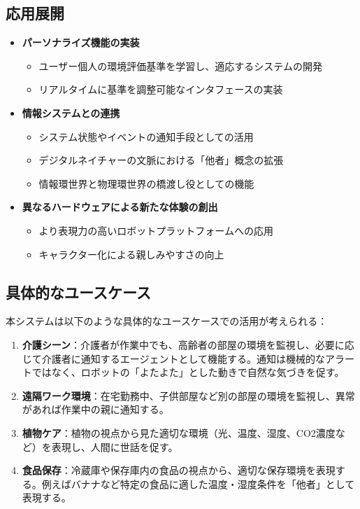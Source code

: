 \documentclass{cuxarticle}
\begin{document}
\subsection{応用展開}
\begin{itemize}
  \item \textbf{パーソナライズ機能の実装}
    \begin{itemize}
      \item ユーザー個人の環境評価基準を学習し、適応するシステムの開発
      \item リアルタイムに基準を調整可能なインタフェースの実装
    \end{itemize}

  \item \textbf{情報システムとの連携}
    \begin{itemize}
      \item システム状態やイベントの通知手段としての活用
      \item デジタルネイチャーの文脈における「他者」概念の拡張
      \item 情報環世界と物理環世界の橋渡し役としての機能
    \end{itemize}

  \item \textbf{異なるハードウェアによる新たな体験の創出}
    \begin{itemize}
      \item より表現力の高いロボットプラットフォームへの応用
      \item キャラクター化による親しみやすさの向上
    \end{itemize}
\end{itemize}

\subsection{具体的なユースケース}
本システムは以下のような具体的なユースケースでの活用が考えられる：

\begin{enumerate}
  \item \textbf{介護シーン}：介護者が作業中でも、高齢者の部屋の環境を監視し、必要に応じて介護者に通知するエージェントとして機能する。通知は機械的なアラートではなく、ロボットの「よたよた」とした動きで自然な気づきを促す。

  \item \textbf{遠隔ワーク環境}：在宅勤務中、子供部屋など別の部屋の環境を監視し、異常があれば作業中の親に通知する。

  \item \textbf{植物ケア}：植物の視点から見た適切な環境（光、温度、湿度、CO2濃度など）を表現し、人間に世話を促す。

  \item \textbf{食品保存}：冷蔵庫や保存庫内の食品の視点から、適切な保存環境を表現する。例えばバナナなど特定の食品に適した温度・湿度条件を「他者」として表現する。
\end{enumerate}
\end{document}

